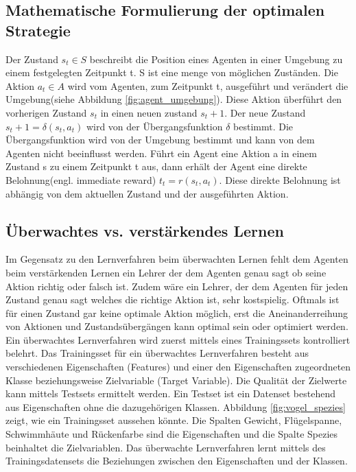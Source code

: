 \subsection{Mathematische Formulierung der optimalen Strategie}
Der Zustand $s_t \in S$ beschreibt die Position eines Agenten in einer Umgebung zu einem festgelegten Zeitpunkt t. S ist eine menge von möglichen Zuständen. Die Aktion $a_t \in A$ wird vom Agenten, zum Zeitpunkt t, ausgeführt und verändert die Umgebung(siehe Abbildung \ref{fig:agent_umgebung}). Diese Aktion überführt den vorherigen Zustand $s_t$ in einen neuen zustand $s_t+1$. Der neue Zustand $s_t+1 = \delta(s_t, a_t)$ wird von der Übergangsfunktion $\delta$ bestimmt. Die Übergangsfunktion wird von der Umgebung bestimmt und kann von dem Agenten nicht beeinflusst werden. Führt ein Agent eine Aktion a in einem Zustand s zu einem Zeitpunkt t aus, dann erhält der Agent eine direkte Belohnung(engl. immediate reward) $t_t = r(s_t, a_t)$. Diese direkte Belohnung ist abhängig von dem aktuellen Zustand und der ausgeführten Aktion\cite[290]{Ertel}. \\

\subsection{Überwachtes \acs{vs.} verstärkendes Lernen}
Im Gegensatz zu den Lernverfahren beim überwachten Lernen fehlt dem Agenten beim verstärkenden Lernen ein Lehrer der dem Agenten genau sagt ob seine Aktion richtig oder falsch ist. Zudem wäre ein Lehrer, der dem Agenten für jeden Zustand genau sagt welches die richtige Aktion ist, sehr kostspielig. Oftmals ist für einen Zustand gar keine optimale Aktion möglich, erst die Aneinanderreihung von Aktionen und Zustandsübergängen kann optimal sein oder optimiert werden\cite[\acs{vgl.} 397]{Alpaydin}. \\

Ein überwachtes Lernverfahren wird zuerst mittels eines Trainingssets kontrolliert belehrt. Das Trainingsset für ein überwachtes Lernverfahren besteht aus verschiedenen Eigenschaften (Features) und einer den Eigenschaften zugeordneten Klasse beziehungsweise Zielvariable (Target Variable). Die Qualität der Zielwerte kann mittels Testsets ermittelt werden. Ein Testset ist ein Datenset bestehend aus Eigenschaften ohne die dazugehörigen Klassen. Abbildung \ref{fig:vogel_spezies} zeigt, wie ein Trainingsset aussehen könnte\cite[8]{Harrington}. Die Spalten Gewicht, Flügelspanne, Schwimmhäute und Rückenfarbe sind die Eigenschaften und die Spalte Spezies beinhaltet die Zielvariablen. Das überwachte Lernverfahren lernt mittels des Trainingsdatensets die Beziehungen zwischen den Eigenschaften und der Klassen. \\

